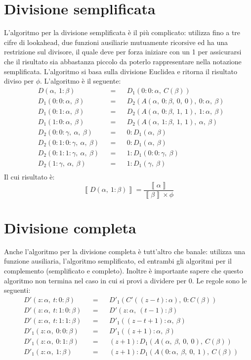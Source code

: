 \documentclass[Lau]{sapthesis}
\begin{document}
\section{Divisione semplificata}
L'algoritmo per la divisione semplificata è il più complicato: utilizza fino a tre cifre di lookahead, due funzioni ausiliarie mutuamente ricorsive ed ha una restrizione sul divisore, il quale deve per forza iniziare con un 1 per assicurarsi che il risultato sia abbastanza piccolo da poterlo rappresentare nella notazione semplificata. L'algoritmo si basa sulla divisione Euclidea e ritorna il risultato diviso per $\phi$. L'algoritmo è il seguente:
\begin{align*}
&D(\alpha, \ 1:\beta) && = && D_1(0:0:\alpha, \ C(\beta))\\
&D_1(0:0:\alpha, \ \beta) && = && D_2(A(\alpha, \ 0:\beta, \ 0, \ 0), \ 0:\alpha, \ \beta)\\
&D_1(0:1:\alpha, \ \beta) && = && D_2(A(\alpha, \ 0:\beta, \ 1, \ 1), \ 1:\alpha, \ \beta)\\
&D_1(1:0:\alpha, \ \beta) && = && D_2(A(\alpha, \ 1:\beta, \ 1, \ 1), \ \alpha, \ \beta)\\
&D_2(0:0:\gamma, \ \alpha, \ \beta) && = && 0:D_1(\alpha, \ \beta)\\
&D_2(0:1:0:\gamma, \ \alpha, \ \beta) && = && 0:D_1(\alpha, \ \beta)\\
&D_2(0:1:1:\gamma, \ \alpha, \ \beta) && = && 1:D_1(0:0:\gamma, \ \beta)\\
&D_2(1:\gamma, \ \alpha, \ \beta) && = && 1:D_1(\gamma, \ \beta)\\
\end{align*}
Il cui risultato è:
$$\left\llbracket D(\alpha, \ 1:\beta) \right\rrbracket = \frac{\left\llbracket \alpha \right\rrbracket}{\left\llbracket \beta \right\rrbracket \times \phi}$$


\section{Divisione completa}
Anche l'algoritmo per la divisione completa è tutt'altro che banale: utilizza una funzione ausiliaria, l'algoritmo semplificato, ed entrambi gli algoritmi per il complemento (semplificato e completo). Inoltre è importante sapere che questo algoritmo non termina nel caso in cui si provi a dividere per 0. Le regole sono le seguenti:
\begin{align*}
&D'(z:\alpha, \ t:0:\beta) && = && D'_1(C'((z-t):\alpha), \ 0:C(\beta))\\
&D'(z:\alpha, \ t:1:0:\beta) && = && D'(z:\alpha, \ (t-1):\beta)\\
&D'(z:\alpha, \ t:1:1:\beta) && = && D'_1((z-t+1):\alpha, \ \beta)\\
&D'_1(z:\alpha, \ 0:0:\beta) && = && D'_1((z+1):\alpha, \ \beta)\\
&D'_1(z:\alpha, \ 0:1:\beta) && = && (z+1):D_1(A(\alpha, \ \beta, \ 0, \ 0), \ C(\beta))\\
&D'_1(z:\alpha, \ 1:\beta) && = && (z+1): D_1(A(0:\alpha, \ \beta, \ 0, \ 1), \ C(\beta))
\end{align*}
\end{document}
